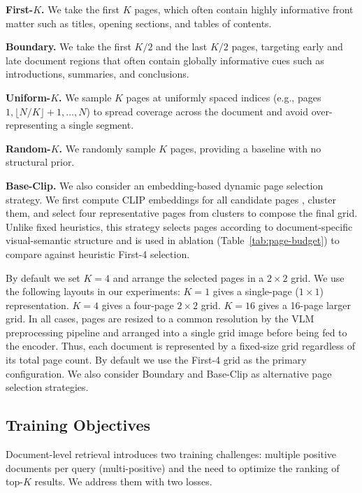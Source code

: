 \textbf{First-$K$.} We take the first $K$ pages, which often contain highly informative front matter such as titles, opening sections, and tables of contents.

\textbf{Boundary.} We take the first $K/2$ and the last $K/2$ pages, targeting early and late document regions that often contain globally informative cues such as introductions, summaries, and conclusions.

\textbf{Uniform-$K$.} We sample $K$ pages at uniformly spaced indices (e.g., pages $1, \lfloor N/K \rfloor{+}1, \ldots, N$) to spread coverage across the document and avoid over-representing a single segment.

\textbf{Random-$K$.} We randomly sample $K$ pages, providing a baseline with no structural prior.

\textbf{Base-Clip.} We also consider an embedding-based dynamic page selection strategy. We first compute CLIP embeddings for all candidate pages \citep{pmlr-v139-radford21a}, cluster them, and select four representative pages from clusters to compose the final grid. Unlike fixed heuristics, this strategy selects pages according to document-specific visual-semantic structure and is used in ablation (Table~\ref{tab:page-budget}) to compare against heuristic First-4 selection.

By default we set $K=4$ and arrange the selected pages in a $2{\times}2$ grid. We use the following layouts in our experiments: $K{=}1$ gives a single-page ($1{\times}1$) representation. $K{=}4$ gives a four-page $2{\times}2$ grid. $K{=}16$ gives a 16-page larger grid. In all cases, pages are resized to a common resolution by the VLM preprocessing pipeline and arranged into a single grid image before being fed to the encoder. Thus, each document is represented by a fixed-size grid regardless of its total page count. By default we use the First-4 grid as the primary configuration. We also consider Boundary and Base-Clip as alternative page selection strategies.

\subsection{Training Objectives}
\label{sec:training-objectives}

Document-level retrieval introduces two training challenges: multiple positive documents per query (multi-positive) and the need to optimize the ranking of top-$K$ results. We address them with two losses.

